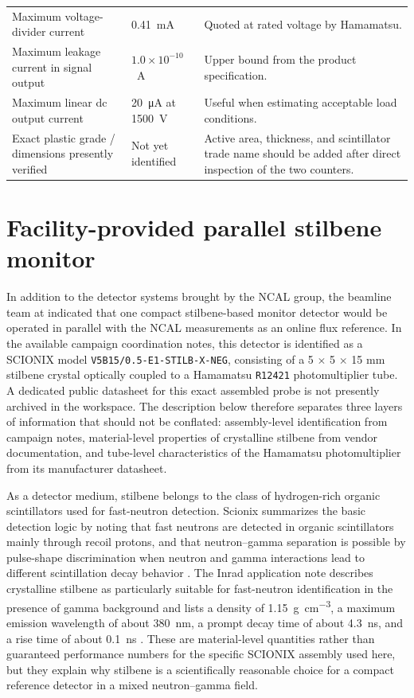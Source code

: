 \begin{table}[htbp]
\begin{tabularx}{\textwidth}{>{\raggedright\arraybackslash}p{4.2cm}YY}
Maximum voltage-divider current & \SI{0.41}{mA} & Quoted at rated voltage by Hamamatsu. \\
Maximum leakage current in signal output & $1.0\times10^{-10}$~A & Upper bound from the product specification. \\
Maximum linear dc output current & \SI{20}{\micro A} at \SI{1500}{V} & Useful when estimating acceptable load conditions. \\
Exact plastic grade / dimensions presently verified & Not yet identified & Active area, thickness, and scintillator trade name should be added after direct inspection of the two counters. \\
\bottomrule
\end{tabularx}
\end{table}

\section{Facility-provided parallel stilbene monitor}

In addition to the detector systems brought by the NCAL group, the beamline team at \NCALInstitute indicated that one compact stilbene-based monitor detector would be operated in parallel with the NCAL measurements as an online flux reference. In the available campaign coordination notes, this detector is identified as a SCIONIX model \texttt{V5B15/0.5-E1-STILB-X-NEG}, consisting of a 5 $\times$ 5 $\times$ 15 mm stilbene crystal optically coupled to a Hamamatsu \texttt{R12421} photomultiplier tube. A dedicated public datasheet for this exact assembled probe is not presently archived in the workspace. The description below therefore separates three layers of information that should not be conflated: assembly-level identification from campaign notes, material-level properties of crystalline stilbene from vendor documentation, and tube-level characteristics of the Hamamatsu photomultiplier from its manufacturer datasheet.

As a detector medium, stilbene belongs to the class of hydrogen-rich organic scintillators used for fast-neutron detection. Scionix summarizes the basic detection logic by noting that fast neutrons are detected in organic scintillators mainly through recoil protons, and that neutron--gamma separation is possible by pulse-shape discrimination when neutron and gamma interactions lead to different scintillation decay behavior \citep{ScionixNeutronScintillatorNote}. The Inrad application note describes crystalline stilbene as particularly suitable for fast-neutron identification in the presence of gamma background and lists a density of \SI{1.15}{\gram\per\centi\meter\cubed}, a maximum emission wavelength of about \SI{380}{nm}, a prompt decay time of about \SI{4.3}{ns}, and a rise time of about \SI{0.1}{ns} \citep{InradStilbeneNote}. These are material-level quantities rather than guaranteed performance numbers for the specific SCIONIX assembly used here, but they explain why stilbene is a scientifically reasonable choice for a compact reference detector in a mixed neutron--gamma field.

